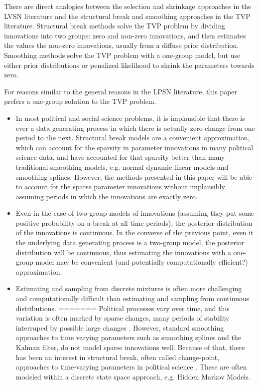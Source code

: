 \documentclass{article}
\begin{document}
There are direct analogies between the selection and shrinkage approaches in the LVSN literature and the structural break and smoothing approaches in the TVP literature.
Structural break methods solve the TVP problem by dividing innovations into two groups: zero and non-zero innovations, and then estimates the values the non-zero innovations, usually from a diffuse prior distribution.
Smoothing methods solve the TVP problem with a one-group model, but use either prior distributions or penalized likelihood to shrink the parameters towards zero.

For reasons similar to the general reasons in the LPSN literature, this paper prefers a one-group solution to the TVP problem. 

\begin{itemize}
\item In most political and social science problems, it is implausible that there is ever a data generating process in which there is actually zero change from one period to the next.
Structural break models are a convenient approximation, which can account for the sparsity in parameter innovations in many political science data, and have accounted for that sparsity better than many traditional smoothing models, e.g. normal dynamic linear models and smoothing splines.
However, the methods presented in this paper will be able to account for the sparse parameter innovations without implausibly assuming periods in which the innovations are exactly zero.
\item Even in the case of two-group models of innovations (assuming they put some positive probability on a break at all time periods), the posterior distribution of the innovations is continuous.
In the converse of the previous point, even it the underlying data generating process is a two-group model, the posterior distribution will be continuous, thus estimating the innovations with a one-group model may be convenient (and potentially computationally efficient?) approximation.
\item Estimating and sampling from discrete mixtures is often more challenging and computationally difficult than estimating and sampling from continuous distributions.
=======
Political processes vary over time, and this variation is often marked by sparse changes, many periods of stability interruped by possible large changes \parencite{RatkovicEng2010}.
However, standard smoothing approaches to time varying parameters such as smoothing splines and the Kalman filter, do not model sparse innovations well.
Because of that, there has been an interest in structural break, often called change-point, approaches to time-varying parameters in political science \textcite{Park2011}.
These are often modeled within a discrete state space approach, e.g. Hidden Markov Models.


\end{itemize}
\end{document}
